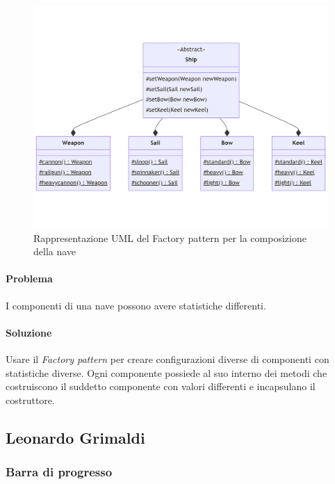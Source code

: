 \documentclass[a4paper,12pt]{report}
\begin{document}
\begin{figure}[H]
	\centering{}
	\includegraphics[width=\textwidth]{img/Factory.png}
	\caption{Rappresentazione UML del Factory pattern per la composizione della nave}
	\label{img:Factory}
\end{figure}

\paragraph{Problema} I componenti di una nave possono avere statistiche differenti.
\paragraph{Soluzione} Usare il \textit{Factory pattern} per creare configurazioni diverse di componenti con statistiche diverse.
%
Ogni componente possiede al suo interno dei metodi che costruiscono il suddetto componente con valori differenti e incapsulano il costruttore.

\subsection*{Leonardo Grimaldi}
\subsubsection*{Barra di progresso}
\end{document}

